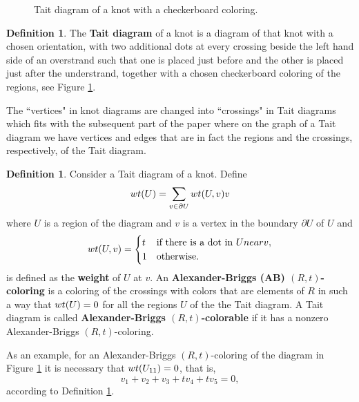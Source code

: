 \documentclass[11pt,a4paper]{article}
\newcommand{\wt}{\textnormal{wt}}
\theoremstyle{definition}
\newtheorem{definition}[theorem]{Definition}
\begin{document}
\begin{figure}[h!]
    \caption{Tait diagram of a knot with a checkerboard coloring.}
    \label{fig:Tait}
\end{figure}

\begin{definition}
\label{def:Tait}
The \textbf{Tait diagram} of a knot is a diagram of that knot with a chosen orientation, with two additional dots at every crossing beside the left 
hand side of an overstrand such that one is placed just before and the other is placed just after the understrand, 
together with a chosen checkerboard coloring of the regions, see Figure \ref{fig:Tait}.
\end{definition}

The ``vertices" in knot diagrams are changed into ``crossings" in Tait diagrams which fits with the subsequent part of the paper where on the graph of a Tait diagram we have vertices and edges that are in fact the regions and the crossings, respectively, of the Tait diagram.


\begin{definition}
\label{def:AB-coloring}
Consider a Tait diagram of a knot. Define
$$
\wt (U) = \sum_{v \in \partial U} \wt (U,v) v
$$
where $U$ is a region of the diagram and $v$ is a vertex in the boundary $\partial U$ of $U$ and
$$
\wt (U,v) = 
\begin{cases}
t & \text{if there is a dot in } U \textnormal{ near } v,\\
1 & \text{otherwise}. 
\end{cases}
$$
is defined as the \textbf{weight} of $U$ at $v$. An \textbf{Alexander-Briggs (AB) $(R,t)$-coloring} is a coloring of the crossings with colors that are elements of $R$ 
in such a way that $\wt(U) = 0$ for all the regions $U$ of the the Tait diagram. A Tait diagram is called \textbf{Alexander-Briggs $(R,t)$-colorable} if it has a nonzero Alexander-Briggs $(R,t)$-coloring.  
\end{definition}

As an example, for an Alexander-Briggs $(R,t)$-coloring of the diagram in Figure \ref{fig:Tait} it is necessary that  $\wt(U_{11}) = 0$, that is,
$$
v_1 + v_2 + v_3 + tv_4 + tv_5 = 0,
$$
according to Definition \ref{def:AB-coloring}.
\end{document}
